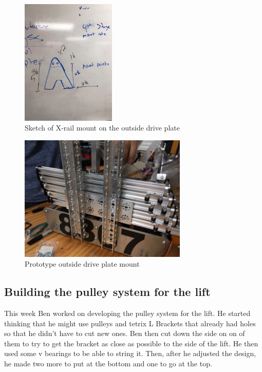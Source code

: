 \documentclass{article}
\begin{document}
\begin{figure}
    \centering
    \includegraphics[height=6cm]{16_12-17/images/x-rail_mount.JPG}
    \caption{Sketch of X-rail mount on the outside drive plate}
    \label{fig:Mount Sketch}
\end{figure}

\begin{figure}
    \centering
    \includegraphics[height=6cm]{16_12-17/images/mount_proto.JPG}
    \caption{Prototype outside drive plate mount}
    \label{Prototype Mount}
\end{figure}

\subsection{Building the pulley system for the lift}
This week Ben worked on developing the pulley system for the lift. He started thinking that he might use pulleys and tetrix L Brackets that already had holes so that he didn't have to cut new ones. Ben then cut down the side on on of them to try to get the bracket as close as possible to the side of the lift. He then used some v bearings to be able to string it. Then, after he adjusted the design, he made two more to put at the bottom and one to go at the top.
\end{document}
